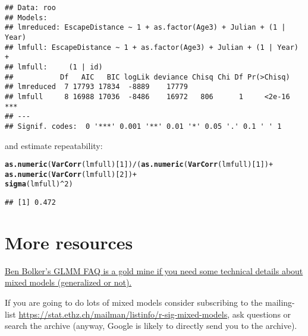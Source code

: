 \documentclass[12pt,a4paper]{scrartcl}\usepackage[]{graphicx}\usepackage[]{color}
\makeatletter
\newcommand{\hlnum}[1]{\textcolor[rgb]{0.686,0.059,0.569}{#1}}%
\newcommand{\hlopt}[1]{\textcolor[rgb]{0,0,0}{#1}}%
\newcommand{\hlstd}[1]{\textcolor[rgb]{0.345,0.345,0.345}{#1}}%
\newcommand{\hlkwd}[1]{\textcolor[rgb]{0.737,0.353,0.396}{\textbf{#1}}}%
\newenvironment{kframe}{%
 \def\at@end@of@kframe{}%
 \ifinner\ifhmode%
  \def\at@end@of@kframe{\end{minipage}}%
  \begin{minipage}{\columnwidth}%
 \fi\fi%
 \def\FrameCommand##1{\hskip\@totalleftmargin \hskip-\fboxsep
 \colorbox{shadecolor}{##1}\hskip-\fboxsep
     \hskip-\linewidth \hskip-\@totalleftmargin \hskip\columnwidth}%
 \MakeFramed {\advance\hsize-\width
   \@totalleftmargin\z@ \linewidth\hsize
   \@setminipage}}%
 {\par\unskip\endMakeFramed%
 \at@end@of@kframe}
\newenvironment{knitrout}{}{} %
\makeatother
\begin{document}
\begin{Answer}
\begin{knitrout}
\begin{kframe}
{\ttfamily\noindent\itshape\color{messagecolor}{\#\# refitting model(s) with ML (instead of REML)}}\begin{verbatim}
## Data: roo
## Models:
## lmreduced: EscapeDistance ~ 1 + as.factor(Age3) + Julian + (1 | Year)
## lmfull: EscapeDistance ~ 1 + as.factor(Age3) + Julian + (1 | Year) + 
## lmfull:     (1 | id)
##           Df   AIC   BIC logLik deviance Chisq Chi Df Pr(>Chisq)    
## lmreduced  7 17793 17834  -8889    17779                            
## lmfull     8 16988 17036  -8486    16972   806      1     <2e-16 ***
## ---
## Signif. codes:  0 '***' 0.001 '**' 0.01 '*' 0.05 '.' 0.1 ' ' 1
\end{verbatim}
\end{kframe}
\end{knitrout}

and estimate repeatability:
\begin{knitrout}
\color{fgcolor}\begin{kframe}
\begin{alltt}
\hlkwd{as.numeric}\hlstd{(}\hlkwd{VarCorr}\hlstd{(lmfull)[}\hlnum{1}\hlstd{])}\hlopt{/}\hlstd{(}\hlkwd{as.numeric}\hlstd{(}\hlkwd{VarCorr}\hlstd{(lmfull)[}\hlnum{1}\hlstd{])}\hlopt{+}
                                  \hlkwd{as.numeric}\hlstd{(}\hlkwd{VarCorr}\hlstd{(lmfull)[}\hlnum{2}\hlstd{])}\hlopt{+}
                                  \hlkwd{sigma}\hlstd{(lmfull)}\hlopt{^}\hlnum{2}\hlstd{)}
\end{alltt}
\begin{verbatim}
## [1] 0.472
\end{verbatim}
\end{kframe}
\end{knitrout}

\end{Answer}

\section{More resources}


\href{http://bbolker.github.io/mixedmodels-misc/glmmFAQ.html}{Ben Bolker's GLMM FAQ is a gold mine if you need some technical details about mixed models (generalized or not).}

If you are going to do lots of mixed models consider subscribing to the mailing-list \href{https://stat.ethz.ch/mailman/listinfo/r-sig-mixed-models}{https://stat.ethz.ch/mailman/listinfo/r-sig-mixed-models}, ask questions or search the archive (anyway, Google is likely to directly send you to the archive).
\end{document}
